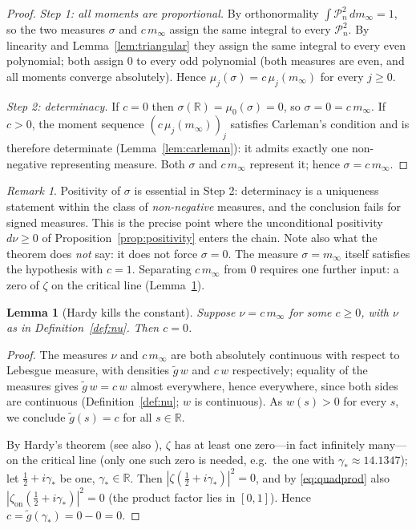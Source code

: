 \documentclass[11pt]{amsart}
\newtheorem{lemma}[theorem]{Lemma}
\theoremstyle{definition}
\theoremstyle{remark}
\newtheorem{remark}[theorem]{Remark}
\newcommand{\bbR}{\mathbb{R}}
\newcommand{\minf}{m_\infty}
\newcommand{\zon}{\zeta_{\mathrm{on}}}
\begin{document}
\begin{proof}
\emph{Step 1: all moments are proportional.} By orthonormality
$\int\mathcal P_n^{2}\,d\minf=1$, so the two measures $\sigma$ and
$c\,\minf$ assign the same integral to every $\mathcal P_n^{2}$. By
linearity and Lemma~\ref{lem:triangular} they assign the same integral to
every even polynomial; both assign $0$ to every odd polynomial (both
measures are even, and all moments converge absolutely). Hence
$\mu_j(\sigma)=c\,\mu_j(\minf)$ for every $j\ge0$.

\emph{Step 2: determinacy.} If $c=0$ then
$\sigma(\bbR)=\mu_0(\sigma)=0$, so $\sigma=0=c\,\minf$. If $c>0$, the
moment sequence $(c\,\mu_j(\minf))_j$ satisfies Carleman's condition and is
therefore determinate (Lemma~\ref{lem:carleman}): it admits exactly one
non-negative representing measure. Both $\sigma$ and $c\,\minf$ represent
it; hence $\sigma=c\,\minf$.
\end{proof}

\begin{remark}
Positivity of $\sigma$ is essential in Step 2: determinacy is a uniqueness
statement within the class of \emph{non-negative} measures, and the
conclusion fails for signed measures. This is the precise point where the
unconditional positivity $d\nu\ge0$ of
Proposition~\ref{prop:positivity} enters the chain. Note also what the
theorem does \emph{not} say: it does not force $\sigma=0$. The measure
$\sigma=\minf$ itself satisfies the hypothesis with $c=1$. Separating
$c\,\minf$ from $0$ requires one further input: a zero of $\zeta$ on the
critical line (Lemma~\ref{lem:hardy}).
\end{remark}

\begin{lemma}[Hardy kills the constant]\label{lem:hardy}
Suppose $\nu=c\,\minf$ for some $c\ge0$, with $\nu$ as in
Definition~\ref{def:nu}. Then $c=0$.
\end{lemma}

\begin{proof}
The measures $\nu$ and $c\,\minf$ are both absolutely continuous with
respect to Lebesgue measure, with densities $\tilde g\,w$ and $c\,w$
respectively; equality of the measures gives $\tilde g\,w=c\,w$ almost
everywhere, hence everywhere, since both sides are continuous
(Definition~\ref{def:nu}; $w$ is continuous). As $w(s)>0$ for every $s$, we
conclude $\tilde g(s)=c$ for all $s\in\bbR$.

By Hardy's theorem \cite{Hardy1914} (see also
\cite[Thm.~10.2]{Titchmarsh}), $\zeta$ has at least one zero---in fact
infinitely many---on the critical line (only one such zero is needed,
e.g.\ the one with $\gamma_*\approx14.1347$); let $\tfrac12+i\gamma_*$ be one,
$\gamma_*\in\bbR$. Then $|\zeta(\tfrac12+i\gamma_*)|^{2}=0$, and by
\eqref{eq:quadprod} also $|\zon(\tfrac12+i\gamma_*)|^{2}=0$ (the product
factor lies in $[0,1]$). Hence $c=\tilde g(\gamma_*)=0-0=0$.
\end{proof}
\end{document}
